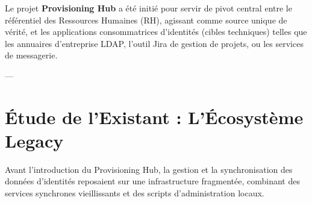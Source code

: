 Le projet \textbf{Provisioning Hub} a été initié pour servir de pivot central entre le référentiel des Ressources Humaines (RH), agissant comme source unique de vérité, et les applications consommatrices d'identités (cibles techniques) telles que les annuaires d'entreprise LDAP, l'outil Jira de gestion de projets, ou les services de messagerie.

---

\section{Étude de l'Existant : L'Écosystème Legacy}
\label{sec:existant}

Avant l'introduction du Provisioning Hub, la gestion et la synchronisation des données d'identités reposaient sur une infrastructure fragmentée, combinant des services synchrones vieillissants et des scripts d'administration locaux.

